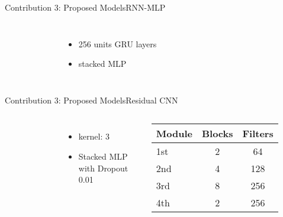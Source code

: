 \begin{frame}{Contribution 3: Proposed Models}{RNN-MLP}
    \begin{columns}
        \begin{figure}
            
        \end{figure}

        \begin{itemize}
            \item 256 units GRU layers
            \item stacked MLP
        \end{itemize}
    \end{columns}
\end{frame}

\begin{frame}{Contribution 3: Proposed Models}{Residual CNN}
    \begin{columns}
        \begin{figure}
            
            \hfill
            
        \end{figure}

        \begin{itemize}
            \item kernel: 3
            \item Stacked MLP with Dropout 0.01
        \end{itemize}
        \begin{tabular}{lSS}
            \hline
            Module & {Blocks} & {Filters} \\
            \hline
            1st    & 2        & 64        \\
            2nd    & 4        & 128       \\
            3rd    & 8        & 256       \\
            4th    & 2        & 256       \\
            \hline
        \end{tabular}
    \end{columns}

\end{frame}

